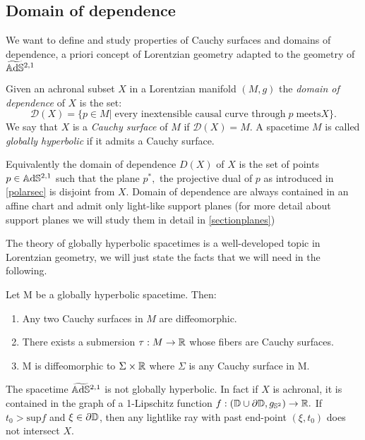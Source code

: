 \subsection{Domain of dependence}
We want to define and study properties of Cauchy surfaces and domains of dependence, a priori concept of Lorentzian geometry adapted to the geometry of $\widetilde{\mathbb{A}\mathrm{d}\mathbb{S}}{}^{2,1}$

\begin{definition}
    Given an achronal subset $X$ in a Lorentzian manifold $(M,g)$ the \textit{domain of dependence} of $X$ is the set: 
    \[
        \mathcal{D}(X)=\{p\in M |\;\text{every inextensible causal curve through}\; p\; \text{meets} X \}.
    \]
    We say that $X$ is a \textit{Cauchy surface} of $M$ if $\mathcal{D}(X)=M$. A spacetime $M$ is called \textit{globally hyperbolic} if it admits a Cauchy surface.
\end{definition}
    
\begin{observation}
    Equivalently the domain of dependence  $D(X)$ of $X$ is the set of points $p\in\mathbb{A}\mathrm{d}\mathbb{S}^{2,1}$ such that the plane $p^*,$ the projective dual of $p$ as introduced in \ref{polarsec} is disjoint from $X.$ Domain of dependence are always contained in an affine chart and admit only light-like support planes (for more detail about support planes we will study them in detail in \ref{sectionplanes})
\end{observation}

The theory of globally hyperbolic spacetimes is a well-developed topic in Lorentzian geometry, we will just state the facts that we will need in the following. 

\begin{theorem}\label{442}
    Let M be a globally hyperbolic spacetime. Then:
    \begin{enumerate}
        \item Any two Cauchy surfaces in $M$ are diffeomorphic. 
        \item There exists a submersion $\tau:M\to\mathbb{R}$ whose fibers are Cauchy surfaces.
        \item M is diffeomorphic to $\Sigma\times\mathbb{R}$ where $\Sigma$ is any Cauchy surface in M.
    \end{enumerate}
\end{theorem}

\begin{observation}
    The spacetime $\widetilde{\mathbb{A}\mathrm{d}\mathbb{S}}{}^{2,1}$ is not globally hyperbolic. In fact if $X$ is achronal, it is contained in the graph of a 1-Lipschitz function $f:(\mathbb{D}\cup\partial\mathbb{D},g_{\mathbb{S}^2})\to\mathbb{R}.$ If $t_0>\text{sup}f$ and $\xi \in \partial\mathbb{D}$, then any lightlike ray with past end-point $(\xi,t_0)$ does not intersect $X.$ 
\end{observation}

